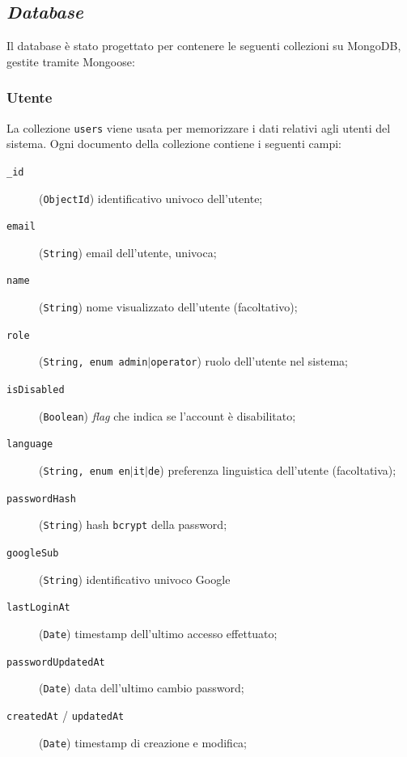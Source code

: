 \subsection{\textit{Database}}
    Il database è stato progettato per contenere le seguenti
    collezioni su MongoDB, gestite tramite Mongoose:
    \subsubsection{Utente}
        La collezione \texttt{users} viene usata per memorizzare i dati
        relativi agli utenti del sistema. Ogni documento della collezione
        contiene i seguenti campi:
        \begin{description}
            \item[\texttt{\_id}] (\texttt{ObjectId}) identificativo univoco dell'utente;
            \item[\texttt{email}] (\texttt{String}) email dell'utente, univoca;
            \item[\texttt{name}] (\texttt{String}) nome visualizzato dell'utente (facoltativo);
            \item[\texttt{role}] (\texttt{String, enum \texttt{admin}$|$\texttt{operator}}) ruolo dell'utente nel sistema;
            \item[\texttt{isDisabled}] (\texttt{Boolean}) \textit{flag} che indica se l'account è disabilitato;
            \item[\texttt{language}] (\texttt{String, enum \texttt{en}$|$\texttt{it}$|$\texttt{de}}) preferenza linguistica dell'utente (facoltativa);
            \item[\texttt{passwordHash}] (\texttt{String}) hash \texttt{bcrypt} della password;
            \item[\texttt{googleSub}] (\texttt{String}) identificativo univoco Google
            \item[\texttt{lastLoginAt}] (\texttt{Date}) timestamp dell'ultimo accesso effettuato;
            \item[\texttt{passwordUpdatedAt}] (\texttt{Date}) data dell'ultimo cambio password;
            \item[\texttt{createdAt} / \texttt{updatedAt}] (\texttt{Date}) timestamp di creazione e modifica;
        \end{description}
